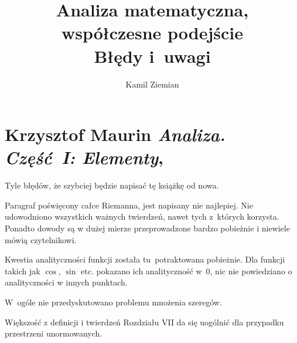 \documentclass[a4paper,11pt]{article}
\title{Analiza matematyczna, współczesne podejście \\
  {\Large Błędy i~uwagi}}
\author{Kamil Ziemian}
\numberwithin{equation}{section}
\begin{document}





\maketitle






\section{Krzysztof Maurin \textit{Analiza. Część~I:
    Elementy}, \parencite{Maurin-Analiza-Vol-I-Pub-1974}}

\vspace{0em}



\vspace{0em}


\noindent
Tyle błędów, że szybciej będzie napisać tę książkę od nowa.

\VerSpaceFour





\noindent
Paragraf poświęcony całce Riemanna, jest napisany nie
najlepiej. Nie udowodniono wszystkich ważnych twierdzeń, nawet tych
z~których korzysta. Ponadto dowody są w dużej mierze przeprowadzone
bardzo pobieżnie i niewiele mówią czytelnikowi.

\VerSpaceFour





\noindent
Kwestia analityczności funkcji została tu~potraktowana
pobieżnie. Dla funkcji takich jak $\cos$, $\sin$ etc. pokazano ich
analityczność w~0, nic nie powiedziano o analityczności w innych
punktach.

\VerSpaceFour





\noindent
W~ogóle nie przedyskutowano problemu mnożenia szeregów.

\VerSpaceFour





\noindent
Większość z definicji i twierdzeń Rozdziału VII da się uogólnić
dla przypadku przestrzeni unormowanych.
\end{document}
